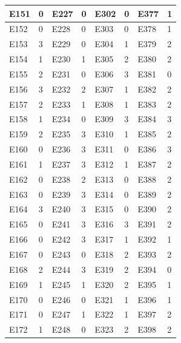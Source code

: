 \documentclass[UTF8]{ctexart}
\begin{document}
\begin{table}[H]
\begin{tabular}{|l|l|l|l|l|l|l|l|}
		E151     & 0        & E227     & 0        & E302     & 0        & E377     & 1        \\ \hline
		E152     & 0        & E228     & 0        & E303     & 0        & E378     & 1        \\ \hline
		E153     & 3        & E229     & 0        & E304     & 1        & E379     & 2        \\ \hline
		E154     & 1        & E230     & 1        & E305     & 2        & E380     & 2        \\ \hline
		E155     & 2        & E231     & 0        & E306     & 3        & E381     & 0        \\ \hline
		E156     & 3        & E232     & 2        & E307     & 1        & E382     & 2        \\ \hline
		E157     & 2        & E233     & 1        & E308     & 1        & E383     & 2        \\ \hline
		E158     & 1        & E234     & 0        & E309     & 3        & E384     & 3        \\ \hline
		E159     & 2        & E235     & 3        & E310     & 1        & E385     & 2        \\ \hline
		E160     & 0        & E236     & 3        & E311     & 0        & E386     & 3        \\ \hline
		E161     & 1        & E237     & 3        & E312     & 1        & E387     & 2        \\ \hline
		E162     & 0        & E238     & 2        & E313     & 0        & E388     & 2        \\ \hline
		E163     & 0        & E239     & 3        & E314     & 0        & E389     & 2        \\ \hline
		E164     & 3        & E240     & 3        & E315     & 0        & E390     & 2        \\ \hline
		E165     & 0        & E241     & 3        & E316     & 3        & E391     & 2        \\ \hline
		E166     & 0        & E242     & 3        & E317     & 1        & E392     & 1        \\ \hline
		E167     & 0        & E243     & 0        & E318     & 2        & E393     & 2        \\ \hline
		E168     & 2        & E244     & 3        & E319     & 2        & E394     & 0        \\ \hline
		E169     & 1        & E245     & 1        & E320     & 2        & E395     & 1        \\ \hline
		E170     & 0        & E246     & 0        & E321     & 1        & E396     & 1        \\ \hline
		E171     & 0        & E247     & 1        & E322     & 1        & E397     & 2        \\ \hline
		E172     & 1        & E248     & 0        & E323     & 2        & E398     & 2        \\ \hline
	\end{tabular}
\end{table}
\end{document}
